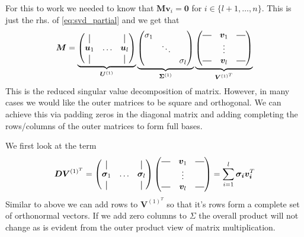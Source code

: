 For this to work we needed to know that $\bm{M} \bm{v}_i = \bm{0}$ for 
$i \in \{l+1, \dots, n\}$.
This is just the rhs. of \eqref{eq:svd_partial} and we get that 
\begin{align}
    \bm{M} = 
    \underbrace{
        \begin{pmatrix}
            \vertbar &        & \vertbar \\
            \bm{u}_1 & \hdots & \bm{u}_l \\
            \vertbar &        & \vertbar 
        \end{pmatrix}
    }_{\bm{U}^{(1)}}
    \underbrace{
    \begin{pmatrix}
        \sigma_1 &        &          \\
                    & \ddots &          \\ 
                    &        & \sigma_l
    \end{pmatrix}
    }_{\bm{\Sigma}^{(1)}}
    \underbrace{
    \begin{pmatrix}
        \horzbar & \bm{v}_1 & \horzbar \\
                    & \vdots   &  \\
        \horzbar & \bm{v}_l &  \horzbar \\
    \end{pmatrix} 
    }_{\bm{V}^{(1)^T}}
\end{align}
This is the reduced singular value decomposition of matrix. 
However, in many cases we would like the outer matrices to be 
square and orthogonal. 
We can achieve this via padding zeros in the diagonal matrix and 
adding completing the rows/columns of the outer matrices to form full bases.

We first look at the term 
\begin{align}
    \bm{DV}^{(1)^T} = 
    \begin{pmatrix}
    \vertbar &        & \vertbar \\
    \bm{\sigma}_1 & \hdots & \bm{\sigma}_l \\
    \vertbar &        & \vertbar 
    \end{pmatrix}
    \begin{pmatrix}
        \horzbar & \bm{v}_1 & \horzbar \\
                    & \vdots   &  \\
        \horzbar & \bm{v}_l &  \horzbar \\
    \end{pmatrix}  = \sum_{i=1}^l \bm{\sigma_i} \bm{v_i}^T
\end{align}
Similar to above we can add rows to $\bm{V}^{(1)^T}$ so that it's rows form a
complete set of orthonormal vectors. If we add zero columns to $\Sigma$ the overall product
will not change as is evident from the outer product view of matrix multiplication.

